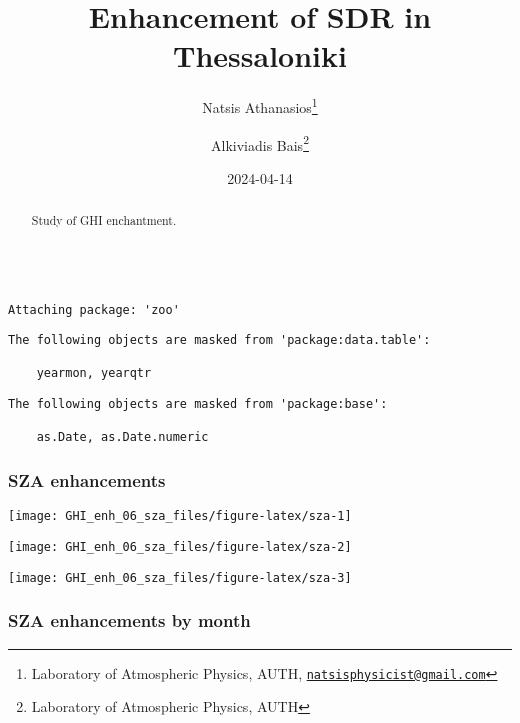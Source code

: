 \documentclass[
  10pt,
  a4paper,oneside]{article}
\title{Enhancement of SDR in Thessaloniki}
\author{Natsis Athanasios\footnote{Laboratory of Atmospheric Physics, AUTH, \href{mailto:natsisphysicist@gmail.com}{\nolinkurl{natsisphysicist@gmail.com}}} \and Alkiviadis Bais\footnote{Laboratory of Atmospheric Physics, AUTH}}
\date{2024-04-14}
\begin{document}
\maketitle
\begin{abstract}
Study of GHI enchantment.
\end{abstract}

{
\hypersetup{linkcolor=}
\setcounter{tocdepth}{4}
\tableofcontents
}
\begin{verbatim}

Attaching package: 'zoo'
\end{verbatim}

\begin{verbatim}
The following objects are masked from 'package:data.table':

    yearmon, yearqtr
\end{verbatim}

\begin{verbatim}
The following objects are masked from 'package:base':

    as.Date, as.Date.numeric
\end{verbatim}

\newpage
\FloatBarrier

\hypertarget{sza-enhancements}{%
\subsubsection{SZA enhancements}\label{sza-enhancements}}

\begin{center}\texttt{[image: GHI\_enh\_06\_sza\_files/figure-latex/sza-1]} \end{center}

\begin{center}\texttt{[image: GHI\_enh\_06\_sza\_files/figure-latex/sza-2]} \end{center}

\begin{center}\texttt{[image: GHI\_enh\_06\_sza\_files/figure-latex/sza-3]} \end{center}

\newpage
\FloatBarrier

\hypertarget{sza-enhancements-by-month}{%
\subsubsection{SZA enhancements by month}\label{sza-enhancements-by-month}}
\end{document}
